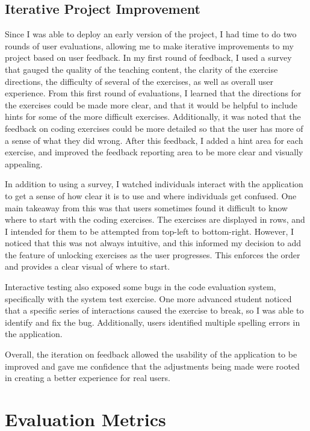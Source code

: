 \documentclass[10pt,twocolumn]{article}
\begin{document}
\subsection{Iterative Project Improvement}

Since I was able to deploy an early version of the project, I had time to do two rounds of user evaluations, allowing me 
to make iterative improvements to my project based on user feedback. In my first round of feedback, I used a survey that 
gauged the quality of the teaching content, the clarity of the exercise directions, the difficulty of several of the 
exercises, as well as overall user experience. From this first round of evaluations, I learned that the directions for 
the exercises could be made more clear, and that it would be helpful to include hints for some of the more difficult 
exercises. Additionally, it was noted that the feedback on coding exercises could be more detailed so that the user 
has more of a sense of what they did wrong. After this feedback, I added a hint area for each exercise, and improved the 
feedback reporting area to be more clear and visually appealing. 

In addition to using a survey, I watched individuals interact with the application to get a sense of how clear it is to 
use and where individuals get confused. One main takeaway from this was that users sometimes found it difficult to know 
where to start with the coding exercises. The exercises are displayed in rows, and I intended for them to be attempted 
from top-left to bottom-right. However, I noticed that this was not always intuitive, and this informed my decision to 
add the feature of unlocking exercises as the user progresses. This enforces the order and provides a clear visual
of where to start. 

Interactive testing also exposed some bugs in the code evaluation system, specifically with the system test
exercise. One more advanced student noticed that a specific series of interactions caused the 
exercise to break, so I was able to identify and fix the bug. Additionally, users identified multiple spelling errors in 
the application. 

Overall, the iteration on feedback allowed the usability of the application to be improved and 
gave me confidence that the adjustments being made were rooted in creating a better experience for real users. 


\section{Evaluation Metrics}
\end{document}
